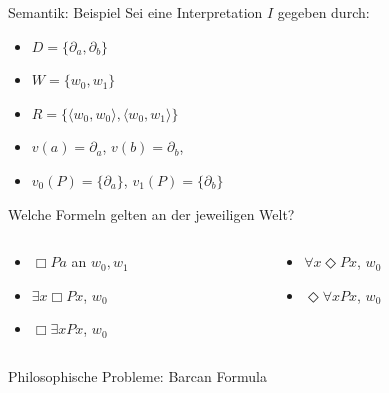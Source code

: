 \documentclass[12pt]{beamer}
\begin{document}
\begin{frame}{Semantik: Beispiel}
  Sei eine Interpretation $I$ gegeben durch: \pause
  \begin{itemize}[<+->]
  \item $D = \{\partial_a, \partial_b\}$
  \item $W = \{w_0, w_1\}$
  \item $R = \{\langle w_0, w_0\rangle ,\langle w_0, w_1 \rangle \}$
  \item $v(a) = \partial_a$, $v(b) = \partial_b$,
  \item $v_{0}(P) = \{\partial_a\}$, $v_1(P) = \{\partial_b\}$
  \end{itemize}
  \pause Welche Formeln gelten an der jeweiligen Welt?
  \begin{columns}
    \begin{column}[t]{.5\linewidth}

      \begin{itemize}[<+->]
      \item $\Box Pa$ an $w_0, w_1$
      \item $\exists x \Box Px$, $w_0$
      \item $\Box \exists x Px$, $w_0$
      \end{itemize}

    \end{column}

    \begin{column}[t]{.5\linewidth}
      \begin{itemize}[<+->]
      \item $\forall x \Diamond Px$, $w_0$
      \item $\Diamond \forall x Px$, $w_0$
      \end{itemize}
    \end{column}
  \end{columns}

\end{frame}


\begin{frame}
  \Huge Philosophische Probleme: Barcan Formula
\end{frame}
\end{document}
